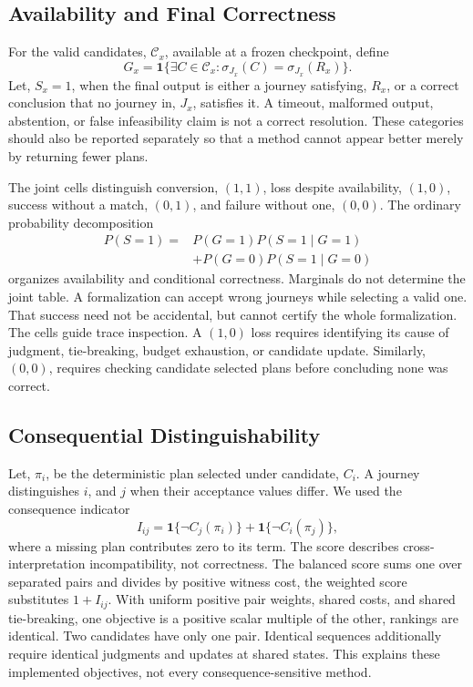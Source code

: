 \documentclass[a4paper,twoside]{article}
\begin{document}
\subsection{Availability and Final Correctness}

For the valid candidates, $\mathcal{C}_x$, available at a frozen checkpoint, define
\begin{equation}
 G_x=\mathbf{1}\{\exists C\in\mathcal{C}_x:
                 \sigma_{J_x}(C)=\sigma_{J_x}(R_x)\}.
\end{equation}
Let, $S_x=1$, when the final output is either a journey satisfying, $R_x$, or a correct conclusion that no journey in, $J_x$, satisfies it. A timeout, malformed output, abstention, or false infeasibility claim is not a correct resolution. These categories should also be reported separately so that a method cannot appear better merely by returning fewer plans.

The joint cells distinguish conversion, $(1,1)$, loss despite availability, $(1,0)$, success without a match, $(0,1)$, and failure without one, $(0,0)$. The ordinary probability decomposition
\begin{align}
 P(S=1)={}&P(G=1)P(S=1\mid G=1)\nonumber\\
          &+P(G=0)P(S=1\mid G=0)
\end{align}
organizes availability and conditional correctness. Marginals do not determine the joint table. A formalization can accept wrong journeys while selecting a valid one. That success need not be accidental, but cannot certify the whole formalization.
The cells guide trace inspection. A $(1,0)$ loss requires identifying its cause of judgment, tie-breaking, budget exhaustion, or candidate update. Similarly, $(0,0)$, requires checking candidate selected plans before concluding none was correct.


\subsection{Consequential Distinguishability}

Let, $\pi_i$, be the deterministic plan selected under candidate, $C_i$. A journey distinguishes $i$, and $j$ when their acceptance values differ. We used the consequence indicator
\begin{equation}
 I_{ij}=\mathbf{1}\{\neg C_j(\pi_i)\}
       +\mathbf{1}\{\neg C_i(\pi_j)\},
\end{equation}
where a missing plan contributes zero to its term. The score describes cross-interpretation incompatibility, not correctness.
The balanced score sums one over separated pairs and divides by positive witness cost, the weighted score substitutes $1+I_{ij}$. With uniform positive pair weights, shared costs, and shared tie-breaking, one objective is a positive scalar multiple of the other, rankings are identical. Two candidates have only one pair. Identical sequences additionally require identical judgments and updates at shared states. This explains these implemented objectives, not every consequence-sensitive method.
\end{document}
